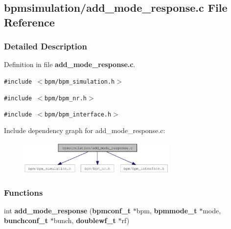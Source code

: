 \subsection{bpmsimulation/add\_\-mode\_\-response.c File Reference}
\label{add__mode__response_8c}


\subsubsection{Detailed Description}


Definition in file {\bf add\_\-mode\_\-response.c}.

{\tt \#include $<$bpm/bpm\_\-simulation.h$>$}\par
{\tt \#include $<$bpm/bpm\_\-nr.h$>$}\par
{\tt \#include $<$bpm/bpm\_\-interface.h$>$}\par


Include dependency graph for add\_\-mode\_\-response.c:\nopagebreak
\begin{figure}[H]
\begin{center}
\leavevmode
\includegraphics[width=223pt]{add__mode__response_8c__incl}
\end{center}
\end{figure}
\subsubsection*{Functions}
\begin{CompactItemize}
\item 
int {\bf add\_\-mode\_\-response} ({\bf bpmconf\_\-t} $\ast$bpm, {\bf bpmmode\_\-t} $\ast$mode, {\bf bunchconf\_\-t} $\ast$bunch, {\bf doublewf\_\-t} $\ast$rf)
\end{CompactItemize}
